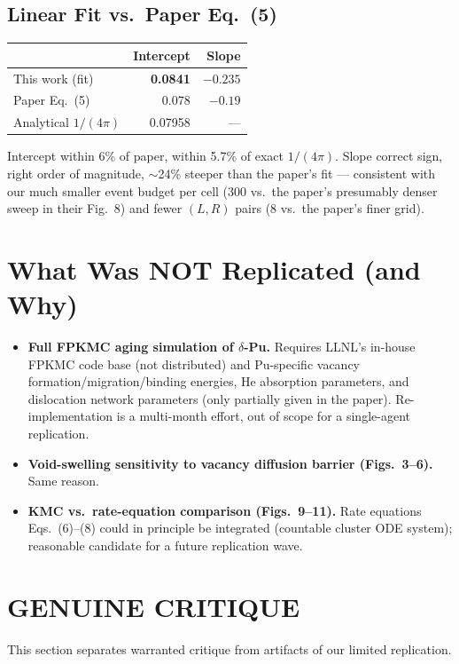 \documentclass[11pt]{article}
\begin{document}
\subsection{Linear Fit vs.\ Paper Eq.~(5)}
\begin{center}
\begin{tabular}{lrr}
\toprule
 & Intercept & Slope \\
\midrule
This work (fit)        & \textbf{0.0841} & \textbf{$-0.235$} \\
Paper Eq.~(5)          & 0.078            & $-0.19$ \\
Analytical $1/(4\pi)$  & 0.07958          & --- \\
\bottomrule
\end{tabular}
\end{center}

Intercept within 6\% of paper, within 5.7\% of exact $1/(4\pi)$. Slope
correct sign, right order of magnitude, $\sim$24\% steeper than the paper's
fit --- consistent with our much smaller event budget per cell (300 vs.\ the
paper's presumably denser sweep in their Fig.~8) and fewer $(L,R)$ pairs (8
vs.\ the paper's finer grid).

\section{What Was NOT Replicated (and Why)}
\begin{itemize}
  \item \textbf{Full FPKMC aging simulation of $\delta$-Pu.} Requires LLNL's
        in-house FPKMC code base (not distributed) and Pu-specific vacancy
        formation/migration/binding energies, He absorption parameters, and
        dislocation network parameters (only partially given in the paper).
        Re-implementation is a multi-month effort, out of scope for a
        single-agent replication.
  \item \textbf{Void-swelling sensitivity to vacancy diffusion barrier
        (Figs.~3--6).} Same reason.
  \item \textbf{KMC vs.\ rate-equation comparison (Figs.~9--11).} Rate
        equations Eqs.~(6)--(8) could in principle be integrated (countable
        cluster ODE system); reasonable candidate for a future replication
        wave.
\end{itemize}

\section{GENUINE CRITIQUE}
This section separates warranted critique from artifacts of our limited
replication.
\end{document}
